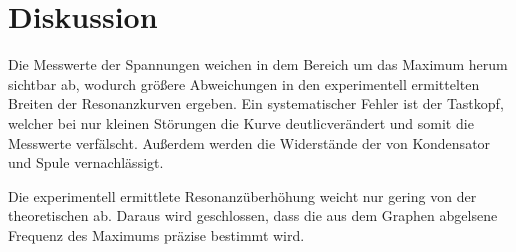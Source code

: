 \section{Diskussion}
\label{sec:Diskussion}

Die Messwerte der Spannungen weichen in dem Bereich um das Maximum herum sichtbar ab, wodurch größere Abweichungen
in den experimentell ermittelten Breiten der Resonanzkurven ergeben. Ein systematischer Fehler ist der Tastkopf,
welcher bei nur kleinen Störungen die Kurve deutlicverändert und somit die Messwerte verfälscht. Außerdem
werden die Widerstände der von Kondensator und Spule vernachlässigt.  


Die experimentell ermittlete Resonanzüberhöhung weicht nur gering von der theoretischen ab. Daraus wird
geschlossen, dass die aus dem Graphen abgelsene Frequenz des Maximums präzise bestimmt wird.
